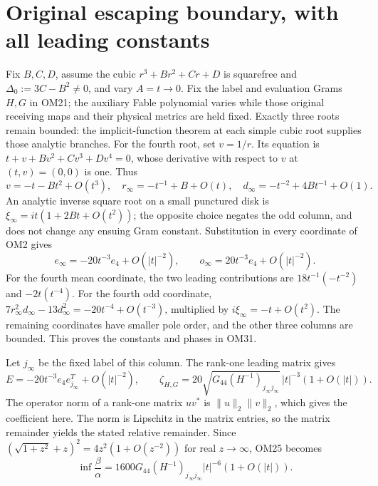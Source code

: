 \documentclass[11pt]{article}
\begin{document}
\section{Original escaping boundary, with all leading constants}
Fix $B,C,D$, assume the cubic $r^3+Br^2+Cr+D$ is squarefree
and $\Delta_0:=3C-B^2\ne0$, and vary $A=t\to0$.
Fix the label and evaluation Grams $H,G$ in OM21; the auxiliary
Fable polynomial varies while those original receiving maps
and their physical metrics are held fixed.
Exactly three roots remain bounded: the implicit-function theorem
at each simple cubic root supplies those analytic branches.
For the fourth root, set $v=1/r$.  Its equation is
$t+v+Bv^2+Cv^3+Dv^4=0$, whose derivative with respect to $v$
at $(t,v)=(0,0)$ is one.  Thus
\[
v=-t-Bt^2+O(t^3),\quad
r_\infty=-t^{-1}+B+O(t),\quad
d_\infty=-t^{-2}+4Bt^{-1}+O(1).
\tag{OM30}
\]
An analytic inverse square root on a small punctured disk is
$\xi_\infty=it(1+2Bt+O(t^2))$; the opposite choice negates
the odd column, and does not change any ensuing Gram constant.
Substitution in every coordinate of OM2 gives
\[
e_\infty=-20t^{-3}e_4+O(|t|^{-2}),\qquad
o_\infty=20t^{-3}e_4+O(|t|^{-2}).
\tag{OM31}
\]
For the fourth mean coordinate, the two leading contributions
are $18t^{-1}(-t^{-2})$ and $-2t(t^{-4})$.
For the fourth odd coordinate, $7r_\infty^2d_\infty-
13d_\infty^2=-20t^{-4}+O(t^{-3})$, multiplied by
$i\xi_\infty=-t+O(t^2)$.  The remaining coordinates have
smaller pole order, and the other three columns are bounded.
This proves the constants and phases in OM31.

Let $j_\infty$ be the fixed label of this column.
The rank-one leading matrix gives
\[
E=-20t^{-3}e_4e_{j_\infty}^T+O(|t|^{-2}),\qquad
\zeta_{H,G}
=20\sqrt{G_{44}(H^{-1})_{j_\infty j_\infty}}\,
 |t|^{-3}(1+O(|t|)).
\tag{OM32}
\]
The operator norm of a rank-one matrix $uv^*$ is
$\|u\|_2\|v\|_2$, which gives the coefficient here.
The norm is Lipschitz in the matrix entries, so the matrix
remainder yields the stated relative remainder.  Since
$(\sqrt{1+z^2}+z)^2=4z^2(1+O(z^{-2}))$ for real $z\to\infty$,
OM25 becomes
\[
\boxed{\inf\frac{\beta}{\alpha}
=1600G_{44}(H^{-1})_{j_\infty j_\infty}
 |t|^{-6}(1+O(|t|)).}
\tag{OM33}
\]
\end{document}

